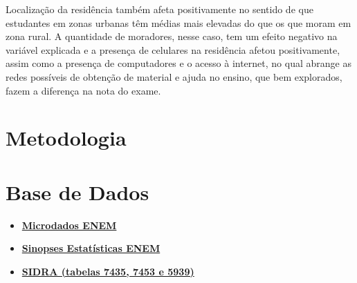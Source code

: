 \documentclass[tcc1,project]{uftex}
\begin{document}
Localização da residência também afeta positivamente no sentido de que estudantes em zonas urbanas têm médias mais elevadas do que os que moram em zona rural. A quantidade de moradores, nesse caso, tem um efeito negativo na variável explicada e a presença de celulares na residência afetou positivamente, assim como a presença de computadores e o acesso à internet, no qual abrange as redes possíveis de obtenção de material e ajuda no ensino, que bem explorados, fazem a diferença na nota do exame. \\  


 
 
\section*{Metodologia}


\section*{Base de Dados}

\begin{itemize}

\item \textbf{\href{https://www.gov.br/inep/pt-br/acesso-a-informacao/dados-abertos/microdados/enem}{Microdados ENEM}}

\item \textbf{\href{https://www.gov.br/inep/pt-br/acesso-a-informacao/dados-abertos/sinopses}{Sinopses Estatísticas ENEM}}

\item \textbf{\href{https://sidra.ibge.gov.br/pesquisa/pnadca/tabelas}{SIDRA (tabelas 7435, 7453 e 5939)}}

\end{itemize}





\appendix
\onehalfspacing	
\end{document}
